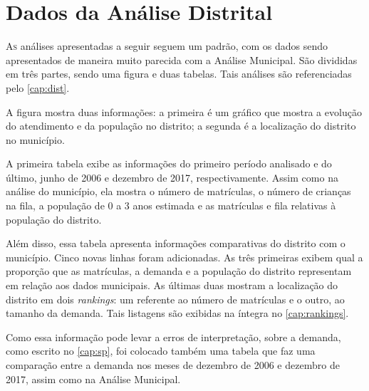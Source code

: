 \chapter{Dados da Análise Distrital}
\label{cap:apendDist}

\lettrine{A}{s} análises apresentadas a seguir seguem um padrão, com os dados sendo apresentados de maneira muito parecida com a Análise Municipal. São divididas em três partes, sendo uma figura e duas tabelas. Tais análises são referenciadas pelo \autoref{cap:dist}.

A figura mostra duas informações: a primeira é um gráfico que mostra a evolução do atendimento e da população no distrito; a segunda é a localização do distrito no município.

A primeira tabela exibe as informações do primeiro período analisado e do último, junho de 2006 e dezembro de 2017, respectivamente. Assim como na análise do município, ela mostra o número de matrículas, o número de crianças na fila, a população de 0 a 3 anos estimada e as matrículas e fila relativas à população do distrito.

Além disso, essa tabela apresenta informações comparativas do distrito com o município. Cinco novas linhas foram adicionadas. As três primeiras exibem qual a proporção que as matrículas, a demanda e a população do distrito representam em relação aos dados municipais. As últimas duas mostram a localização do distrito em dois \textit{rankings}: um referente ao número de matrículas e o outro, ao tamanho da demanda. Tais listagens são exibidas na íntegra no \autoref{cap:rankings}.

Como essa informação pode levar a erros de interpretação, sobre a demanda, como escrito no \autoref{cap:sp}, foi colocado também uma tabela que faz uma comparação entre a demanda nos meses de dezembro de 2006 e dezembro de 2017, assim como na Análise Municipal.
